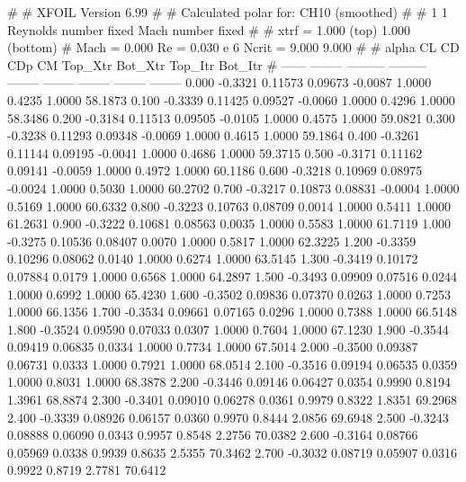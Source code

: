 #  
#       XFOIL         Version 6.99
#  
# Calculated polar for: CH10 (smoothed)                                 
#  
# 1 1 Reynolds number fixed          Mach number fixed         
#  
# xtrf =   1.000 (top)        1.000 (bottom)  
# Mach =   0.000     Re =     0.030 e 6     Ncrit =   9.000  9.000
#  
#   alpha    CL        CD       CDp       CM     Top_Xtr  Bot_Xtr  Top_Itr  Bot_Itr
#  ------ -------- --------- --------- -------- -------- -------- -------- --------
   0.000  -0.3321   0.11573   0.09673  -0.0087   1.0000   0.4235   1.0000  58.1873
   0.100  -0.3339   0.11425   0.09527  -0.0060   1.0000   0.4296   1.0000  58.3486
   0.200  -0.3184   0.11513   0.09505  -0.0105   1.0000   0.4575   1.0000  59.0821
   0.300  -0.3238   0.11293   0.09348  -0.0069   1.0000   0.4615   1.0000  59.1864
   0.400  -0.3261   0.11144   0.09195  -0.0041   1.0000   0.4686   1.0000  59.3715
   0.500  -0.3171   0.11162   0.09141  -0.0059   1.0000   0.4972   1.0000  60.1186
   0.600  -0.3218   0.10969   0.08975  -0.0024   1.0000   0.5030   1.0000  60.2702
   0.700  -0.3217   0.10873   0.08831  -0.0004   1.0000   0.5169   1.0000  60.6332
   0.800  -0.3223   0.10763   0.08709   0.0014   1.0000   0.5411   1.0000  61.2631
   0.900  -0.3222   0.10681   0.08563   0.0035   1.0000   0.5583   1.0000  61.7119
   1.000  -0.3275   0.10536   0.08407   0.0070   1.0000   0.5817   1.0000  62.3225
   1.200  -0.3359   0.10296   0.08062   0.0140   1.0000   0.6274   1.0000  63.5145
   1.300  -0.3419   0.10172   0.07884   0.0179   1.0000   0.6568   1.0000  64.2897
   1.500  -0.3493   0.09909   0.07516   0.0244   1.0000   0.6992   1.0000  65.4230
   1.600  -0.3502   0.09836   0.07370   0.0263   1.0000   0.7253   1.0000  66.1356
   1.700  -0.3534   0.09661   0.07165   0.0296   1.0000   0.7388   1.0000  66.5148
   1.800  -0.3524   0.09590   0.07033   0.0307   1.0000   0.7604   1.0000  67.1230
   1.900  -0.3544   0.09419   0.06835   0.0334   1.0000   0.7734   1.0000  67.5014
   2.000  -0.3500   0.09387   0.06731   0.0333   1.0000   0.7921   1.0000  68.0514
   2.100  -0.3516   0.09194   0.06535   0.0359   1.0000   0.8031   1.0000  68.3878
   2.200  -0.3446   0.09146   0.06427   0.0354   0.9990   0.8194   1.3961  68.8874
   2.300  -0.3401   0.09010   0.06278   0.0361   0.9979   0.8322   1.8351  69.2968
   2.400  -0.3339   0.08926   0.06157   0.0360   0.9970   0.8444   2.0856  69.6948
   2.500  -0.3243   0.08888   0.06090   0.0343   0.9957   0.8548   2.2756  70.0382
   2.600  -0.3164   0.08766   0.05969   0.0338   0.9939   0.8635   2.5355  70.3462
   2.700  -0.3032   0.08719   0.05907   0.0316   0.9922   0.8719   2.7781  70.6412
